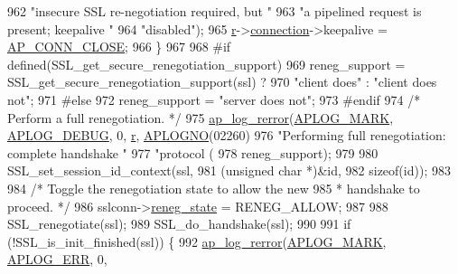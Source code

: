 \begin{DoxyCode}
{{962                               \textcolor{stringliteral}{"insecure SSL re-negotiation required, but "}
963                               \textcolor{stringliteral}{"a pipelined request is present; keepalive "}
964                               \textcolor{stringliteral}{"disabled"});
965                 \hyperlink{group__APACHE__CORE__CONFIG_ga091cdd45984e865a888a4f8bb8fe107a}{r}->\hyperlink{structrequest__rec_a0924aae55826638314f76952ca5d60b1}{connection}->keepalive = \hyperlink{group__APACHE__CORE__DAEMON_gga0fc39bb8f47f9c1f418f28354416db79ac991e8ec951fe03c8c2f36495859034d}{AP\_CONN\_CLOSE};
966             \}
967 
968 \textcolor{preprocessor}{#if defined(SSL\_get\_secure\_renegotiation\_support)}
969             reneg\_support = SSL\_get\_secure\_renegotiation\_support(ssl) ?
970                             \textcolor{stringliteral}{"client does"} : \textcolor{stringliteral}{"client does not"};
971 \textcolor{preprocessor}{#else}
972             reneg\_support = \textcolor{stringliteral}{"server does not"};
973 \textcolor{preprocessor}{#endif}
974             \textcolor{comment}{/* Perform a full renegotiation. */}
975             \hyperlink{group__APACHE__CORE__LOG_ga4c112558ccffd6b363da102b2052d2a6}{ap\_log\_rerror}(\hyperlink{group__APACHE__CORE__LOG_ga655e126996849bcb82e4e5a14c616f4a}{APLOG\_MARK}, \hyperlink{group__APACHE__CORE__LOG_gadfcef90537539cf2b7d35cfbbbafeb93}{APLOG\_DEBUG}, 0, 
      \hyperlink{group__APACHE__CORE__CONFIG_ga091cdd45984e865a888a4f8bb8fe107a}{r}, \hyperlink{group__APACHE__CORE__LOG_ga1dee8a07e06bc5b3de8b89662c2cd666}{APLOGNO}(02260)
976                           \textcolor{stringliteral}{"Performing full renegotiation: complete handshake "}
977                           \textcolor{stringliteral}{"protocol (%
978                           reneg\_support);
979 
980             SSL\_set\_session\_id\_context(ssl,
981                                        (\textcolor{keywordtype}{unsigned} \textcolor{keywordtype}{char} *)&\textcolor{keywordtype}{id},
982                                        \textcolor{keyword}{sizeof}(\textcolor{keywordtype}{id}));
983 
984             \textcolor{comment}{/* Toggle the renegotiation state to allow the new}
985 \textcolor{comment}{             * handshake to proceed. */}
986             sslconn->\hyperlink{structSSLConnRec_ad36678f508db0c5a628b6a99a76bf3c0}{reneg\_state} = RENEG\_ALLOW;
987 
988             SSL\_renegotiate(ssl);
989             SSL\_do\_handshake(ssl);
990 
991             \textcolor{keywordflow}{if} (!SSL\_is\_init\_finished(ssl)) \{
992                 \hyperlink{group__APACHE__CORE__LOG_ga4c112558ccffd6b363da102b2052d2a6}{ap\_log\_rerror}(\hyperlink{group__APACHE__CORE__LOG_ga655e126996849bcb82e4e5a14c616f4a}{APLOG\_MARK}, \hyperlink{group__APACHE__CORE__LOG_ga57ad94ed8c92c4306de90479251a5d58}{APLOG\_ERR}, 0, 
}}}
\end{DoxyCode}
